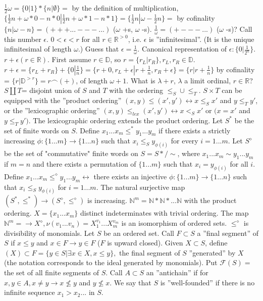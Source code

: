  $\frac{1}{2} \omega = \{0|1\}*\{n|\emptyset \}=$ by the definition of multiplication, $\{\frac{1}{2} n + \omega * 0 - n*0 | \frac{1}{2} n + \omega * 1 - n*1\}=\{\frac{1}{2} n|\omega -\frac{1}{2} n\}=$ by cofinality $\{n|\omega -n\}= (+++...---...)$ ($\omega$ +s, $\omega$ -s).
 $\frac{1}{\omega}= (+---...)$ ($\omega$ -s)? Call this number $\epsilon$. $0<\epsilon <r$ for all $r \in \mathbb{R}^{>0}$, i.e. $\epsilon$ is ''infinitesimal''. (It is the unique infinitesimal of length $\omega$.) Guess that $\epsilon = \frac{1}{\omega}$. Canonical representation of $\epsilon: \{0|\frac{1}{2^n}\}$.
$r + \epsilon (r \in \mathbb{R})$. First assume $r \in \mathbb{D}$, so $r=\{r_L|r_R\}, r_L, r_R \in \mathbb{D}$. $r + \epsilon = \{r_L + r_R\} + \{0|\frac{1}{n}\}=\{r+0, r_L + \epsilon|r+\frac{1}{n}, r_R + \epsilon\}= \{r|r+\frac{1}{n}\}$ by cofinality = $\{r|\mathbb{D}^{>r}\}=r\frown(+)$, of length $\omega +1$.
What is $\lambda +r$, $\lambda$ a limit ordinal, $r \in \mathbb{R}$?
$S \coprod T$= disjoint union of $S$ and $T$ with the ordering $\leq_S \cup \leq_T$.
$S \times T$ can be equipped with the ''product ordering'' $(x,y)\leq(x',y') \leftrightarrow x \leq_S x'$ and $y \leq_T y'$, or the ''lexicographic ordering'' $(x,y) \leq_{lex} (x',y') \leftrightarrow x <_S x'$ or $(x=x'$ and $y \leq_T y')$. The lexicographic ordering extends the product ordering.
Let $S^*$ be the set of finite words on $S$. Define $x_{1}...x_{m} \leq^{*} y_{1}...y_{m}$ if there exists a strictly increasing $\phi: \{1...m\} \rightarrow \{1...n\}$ such that $x_i \leq_S y_{\phi(i)}$ for every $i=1...m$.
Let $S^\diamond$ be the set of "commutative" finite words on $S=S*/ \sim$, where $x_{1}...x_{m} \sim y_{1}...y_{m}$ if $m=n$ and there exists a permutation of $\{1...m\}$ such that $x_i = y_{\phi(i)}$ for all $i$. Define  $x_{1}...x_{m} \leq^{\diamond} y_{1}...y_{m} \leftrightarrow$ there exists an injective $\phi: \{1...m\} \rightarrow \{1...n\}$ such that $x_i \leq_S y_{\phi(i)}$ for $i=1...m$.
The natural surjective map $(S^*, \leq^*) \rightarrow (S^\diamond, \leq^\diamond)$ is increasing.
$\mathbb{N}^m=\mathbb{N} * \mathbb{N} * ...\mathbb{N}$ with the product ordering. $X=\{x_1...x_m\}$ distinct indeterminates with trivial ordering. The map $\mathbb{N}^m= \rightarrow X^\diamond, \nu(v_1...v_n)=X_{1}^{v_1}...X_{m}^{v_m}$ is an isomorphism of ordered sets. $\leq^\diamond$ is divisibility of monomials.
Let $S$ be an ordered set. Call $F \subset S$ a ''final segment'' of $S$ if $x \leq y$ and $x \in F \rightarrow y \in F$ ($F$ is upward closed). Given $X \subset S$, define $(X) \subset F = \{y \in S|\exists x \in X, x \leq y\},$ the final segment of $S$ ''generated'' by $X$ (the notation corresponds to the ideal generated by monomials). Put $\mathcal{F}(S)=$ the set of all finite segments of $S$. Call $A \subset S$ an ''antichain'' if for $x, y \in A, x \neq y \rightarrow x \not\leq y$ and $y \not\leq x$. We say that $S$ is ''well-founded'' if there is no infinite sequence $x_{1}>x_{2}...$ in $S$.

